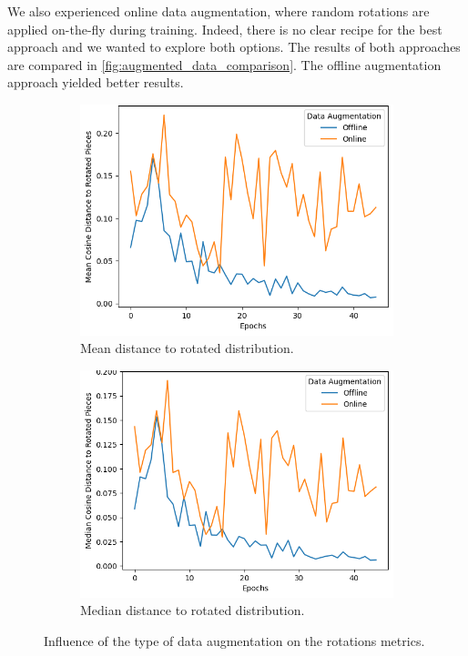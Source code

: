 We also experienced online data augmentation, where random rotations are applied on-the-fly during training. Indeed, there is no clear recipe for the best approach \cite{OfflineDataAugmentation} and we wanted to explore both options. The results of both approaches are compared in \autoref{fig:augmented_data_comparison}. The offline augmentation approach yielded better results.
\begin{figure}[]
    \begin{subfigure}[h]{0.5\linewidth}
        \includegraphics[width=\columnwidth]{images/mean_rotated_data_augmentation_type.png}
        \caption{Mean distance to rotated distribution.}
        \label{fig:mean_rotated_data_augmentation_type}
    \end{subfigure}
    \hfill
    \begin{subfigure}[h]{0.5\linewidth}
        \includegraphics[width=\columnwidth]{images/median_rotated_data_augmentation_type.png}
        \caption{Median distance to rotated distribution.}
        \label{fig:median_rotated_data_augmentation_type}
    \end{subfigure}
    \caption{Influence of the type of data augmentation on the rotations metrics.}
    \label{fig:augmented_data_comparison}
\end{figure}

